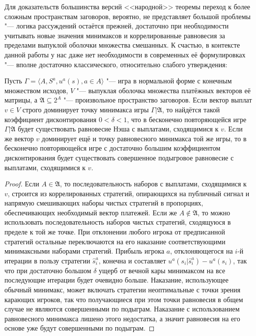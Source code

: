 Для доказательств большинства версий <<народной>> теоремы переход к более сложным пространствам заговоров, вероятно, не представляет большой проблемы "--- логика рассуждений остаётся прежней, достаточно при необходимости учитывать новые значения минимаксов и коррелированные равновесия за пределами выпуклой оболочки множества смешанных. К счастью, в контексте данной работы у нас даже нет необходимости в современных её формулировках "--- вполне достаточно классического, относительно слабого утверждения:
\begin{theorem}\label{the:folk}
	Пусть $\Gamma = \langle A, S^a, u^a(s), a \in A \rangle$ "--- игра в нормальной форме с конечным множеством исходов, $V$ "--- выпуклая оболочка множества платёжных векторов её матрицы, а $\mathfrak{A} \subseteq 2^A$ "--- произвольное пространство заговоров. Если вектор выплат $v \in V$ строго доминирует точку минимакса игры $\Gamma | \mathfrak{A}$, то найдётся такой коэффициент дисконтирования $0 < \delta < 1$, что в бесконечно повторяющейся игре $\Gamma | \mathfrak{A}$ будет существовать равновесие Нэша с выплатами, сходящимися к $v$. Если же вектор $v$ доминирует ещё и точку равновесного минимакса той же игры, то в бесконечно повторяющейся игре с достаточно большим коэффициентом дисконтирования будет существовать совершенное подыгровое равновесие с выплатами, сходящимися к $v$.
\end{theorem}
\begin{proof}
	Если $A \in \mathfrak{A}$, то последовательность наборов с выплатами, сходящимися к $v$, строится из коррелированных стратегий, опирающихся на публичный сигнал и напрямую смешивающих наборы чистых стратегий в пропорциях, обеспечивающих необходимый вектор платежей. Если же $A \notin \mathfrak{A}$, то можно использовать последовательность наборов чистых стратегий, сходящуюся в пределе к той же точке. При отклонении любого игрока от предписанной стратегий остальные переключаются на его наказание соответствующими минимаксными наборами стратегий. Прибыль игрока $a$, отклоняющегося на $i$-й итерации в пользу стратегии $\hat{s}^a_i$, конечна и составляет $u^a(s_i | \hat{s}^a_i) - u^a(s_i)$, так что при достаточно большом $\delta$ ущерб от вечной кары минимаксом на все последующие итерации будет очевидно больше. Наказание, использующее обычный минимакс, может включать стратегии неоптимальные с точки зрения карающих игроков, так что получающиеся при этом точки равновесия в общем случае не являются совершенными по подыграм. Наказание с использованием равновесного минимакса лишено этого недостатка, а значит равновесия на его основе уже будут совершенными по подыграм.	
\end{proof}

